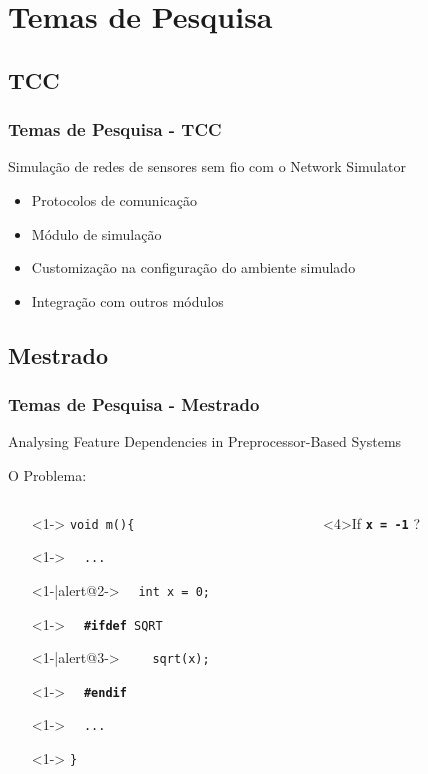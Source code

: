 \section{Temas de Pesquisa}

\subsection{TCC}
\begin{frame}
	\frametitle{Temas de Pesquisa - TCC}
	Simulação de redes de sensores sem fio com o Network Simulator
	\begin{itemize}
		\item Protocolos de comunicação
		\item Módulo de simulação
		\item Customização na configuração do ambiente simulado
		\item Integração com outros módulos
	\end{itemize}
\end{frame}


\subsection{Mestrado}
\begin{frame}
	\frametitle{Temas de Pesquisa - Mestrado}
	Analysing Feature Dependencies in Preprocessor-Based Systems
	
	\begin{itemize}
		\item[] 
	\end{itemize}
	
	O Problema:
	\begin{columns}
	\begin{column}{4cm}
	\begin{itemize}
		\item[]<1-> \texttt{void m()\{}
		\item[]<1-> \texttt{$\quad$...}
		\item[]<1-|alert@2-> \texttt{$\quad$int x = 0;}
		\item[]<1-> \texttt{\textbf{$\quad$\#ifdef} SQRT}
		\item[]<1-|alert@3-> \texttt{$\qquad$sqrt(x);}
		\item[]<1-> \texttt{\textbf{$\quad$\#endif}}
		\item[]<1-> \texttt{$\quad$...}
		\item[]<1-> \texttt{\}}
	\end{itemize}
	\end{column}

	\begin{column}{6cm}
		\begin{overlayarea}{\textwidth}{.4\textheight}
			\begin{onlyenv}<4>{If \texttt{\textbf{x = -1}} ?}\end{onlyenv}
		\end{overlayarea}
	\end{column}
	\end{columns}
\end{frame}

